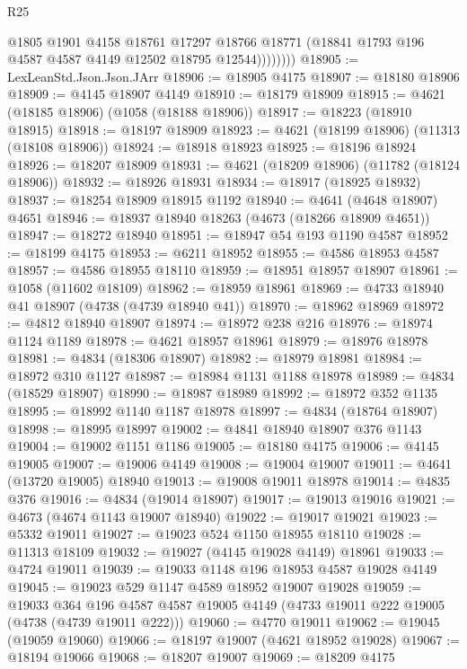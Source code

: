 \begin{lexlean}{R25}
\begin{coremodule}
                  @1805
                  @1901
                  @4158
                  @18761
                  @17297
                  @18766
                  @18771
                  (@18841 @1793 @196 @4587 @4587 @4149 @12502 @18795 @12544))))))))
@18905 := LexLeanStd.Json.Json.JArr
@18906 := @18905 @4175
@18907 := @18180 @18906
@18909 := @4145 @18907 @4149
@18910 := @18179 @18909
@18915 := @4621 (@18185 @18906) (@1058 (@18188 @18906))
@18917 := @18223 (@18910 @18915)
@18918 := @18197 @18909
@18923 := @4621 (@18199 @18906) (@11313 (@18108 @18906))
@18924 := @18918 @18923
@18925 := @18196 @18924
@18926 := @18207 @18909
@18931 := @4621 (@18209 @18906) (@11782 (@18124 @18906))
@18932 := @18926 @18931
@18934 := @18917 (@18925 @18932)
@18937 := @18254 @18909 @18915 @1192
@18940 := @4641 (@4648 @18907) @4651
@18946 := @18937 @18940 @18263 (@4673 (@18266 @18909 @4651))
@18947 := @18272 @18940
@18951 := @18947 @54 @193 @1190 @4587
@18952 := @18199 @4175
@18953 := @6211 @18952
@18955 := @4586 @18953 @4587
@18957 := @4586 @18955 @18110
@18959 := @18951 @18957 @18907
@18961 := @1058 (@11602 @18109)
@18962 := @18959 @18961
@18969 := @4733 @18940 @41 @18907 (@4738 (@4739 @18940 @41))
@18970 := @18962 @18969
@18972 := @4812 @18940 @18907
@18974 := @18972 @238 @216
@18976 := @18974 @1124 @1189
@18978 := @4621 @18957 @18961
@18979 := @18976 @18978
@18981 := @4834 (@18306 @18907)
@18982 := @18979 @18981
@18984 := @18972 @310 @1127
@18987 := @18984 @1131 @1188 @18978
@18989 := @4834 (@18529 @18907)
@18990 := @18987 @18989
@18992 := @18972 @352 @1135
@18995 := @18992 @1140 @1187 @18978
@18997 := @4834 (@18764 @18907)
@18998 := @18995 @18997
@19002 := @4841 @18940 @18907 @376 @1143
@19004 := @19002 @1151 @1186
@19005 := @18180 @4175
@19006 := @4145 @19005
@19007 := @19006 @4149
@19008 := @19004 @19007
@19011 := @4641 (@13720 @19005) @18940
@19013 := @19008 @19011 @18978
@19014 := @4835 @376
@19016 := @4834 (@19014 @18907)
@19017 := @19013 @19016
@19021 := @4673 (@4674 @1143 @19007 @18940)
@19022 := @19017 @19021
@19023 := @5332 @19011
@19027 := @19023 @524 @1150 @18955 @18110
@19028 := @11313 @18109
@19032 := @19027 (@4145 @19028 @4149) @18961
@19033 := @4724 @19011
@19039 := @19033 @1148 @196 @18953 @4587 @19028 @4149
@19045 := @19023 @529 @1147 @4589 @18952 @19007 @19028
@19059 := @19033
    @364
    @196
    @4587
    @4587
    @19005
    @4149
    (@4733 @19011 @222 @19005 (@4738 (@4739 @19011 @222)))
@19060 := @4770 @19011
@19062 := @19045 (@19059 @19060)
@19066 := @18197 @19007 (@4621 @18952 @19028)
@19067 := @18194 @19066
@19068 := @18207 @19007
@19069 := @18209 @4175

\end{coremodule}
\end{lexlean}
